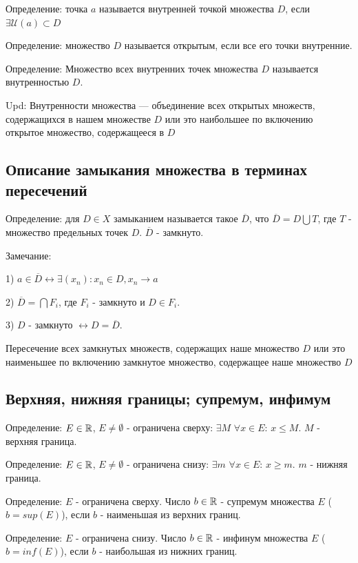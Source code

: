 Определение: точка $a$ называется внутренней точкой множества $D$, если $\exists  \mathcal{U}(a) \subset D$

Определение: множество $D$ называется открытым, если все его точки внутренние.

Определение: Множество всех внутренних точек множества $D$ называется внутренностью $D$.

Upd: Внутренности множества --- объединение всех открытых множеств, содержащихся в нашем множестве $D$ или это наибольшее по включению открытое множество, содержащееся в $D$
\newpage
\subsection{Описание замыкания множества в терминах пересечений}

Определение: для $D \in X$ замыканием называется такое $\overline D$, что $\overline D = D \bigcup T$, где $T$ - множество предельных точек $D$. $\overline D$ - замкнуто.

Замечание: 

	1) $a \in \overline D \leftrightarrow \exists (x_n): x_n \in D, x_n \rightarrow a$ 
	
	2) $\overline D = \bigcap F_i$, где $F_i$ - замкнуто и $D \in F_i$.
	
	3) $D$ - замкнуто $\leftrightarrow D = \overline D$.
	
Пересечение всех замкнутых множеств, содержащих наше множество $D$ или это наименьшее по включению замкнутое множество, содержащее наше множество $D$

\newpage
\subsection{Верхняя, нижняя границы; супремум, инфимум}
Определение: $E \in\operatorname*{\mathbb{R}} $, $E \neq\emptyset $ - ограничена сверху: $\exists M$ $\forall x \in E$: $x \leq M$. $M$ - верхняя граница.

Определение: $E \in\operatorname*{\mathbb{R}} $, $E \neq\emptyset $ - ограничена снизу: $\exists m$ $\forall x \in E$: $x \geq m$. $m$ - нижняя граница.

Определение: $E$ - ограничена сверху. Число $b \in \operatorname*{\mathbb{R}}$ - супремум множества $E$ ($b = sup (E)$), если $b$ - наименьшая из верхних границ.

Определение: $E$ - ограничена снизу. Число $b \in \operatorname*{\mathbb{R}}$ - инфинум множества $E$ ($b = inf (E)$), если $b$ - наибольшая из нижних границ.

